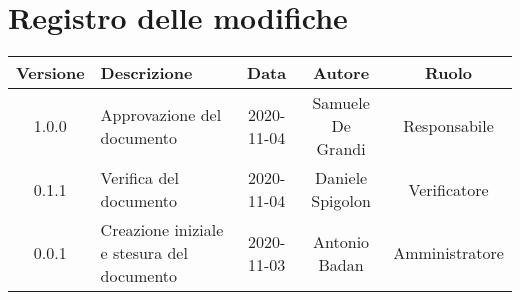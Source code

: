 \section*{Registro delle modifiche}

\begin{center}
	\begin{longtable}{|c|p{5cm}|c|c|c|}
	\hline
	\rowcolor{lighter-grayer}
	\textbf{Versione} & \textbf{Descrizione} & \textbf{Data} & \textbf{Autore} & \textbf{Ruolo} \\
	\hline
	\endfirsthead


	1.0.0 & Approvazione del documento & 2020-11-04 & Samuele De Grandi & Responsabile \\
	\hline
	0.1.1 & Verifica del documento & 2020-11-04 & Daniele Spigolon & Verificatore \\
	\hline
	0.0.1 & Creazione iniziale e stesura del documento & 2020-11-03 & Antonio Badan & Amministratore \\
	\hline
	\end{longtable}
\end{center}